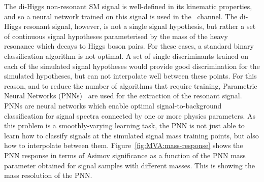 


The di-Higgs non-resonant SM signal is well-defined in its kinematic properties, and so a 
neural network trained on this signal is used in the \lephad\ channel.
The di-Higgs resonant signal, however, is not a single signal hypothesis, 
but rather a set of continuous signal hypotheses parameterised by 
the mass of the heavy resonance which decays to Higgs boson pairs.
For these cases, a standard binary classification algorithm is not optimal. 
A set of single discriminants trained on each of the simulated signal hypotheses 
would provide good discrimination for the simulated hypotheses, 
but can not interpolate well between these points. 
For this reason, and to reduce the number of algorithms that require training, 
Parametric Neural Networks (PNNs)~\cite{Baldi:2016fzo} are used 
for the extraction of the resonant signal. PNNs are neural networks 
which enable optimal signal-to-background classification
for signal spectra connected by one or more physics parameters. 
As this problem is a smoothly-varying learning task, 
the PNN is not just able to learn how to classify signals at the simulated signal mass training
points, but also how to interpolate between them. 
Figure~\ref{fig:MVA:mass-response} shows the PNN response 
in terms of Asimov significance as a function of the PNN mass
parameter obtained for signal samples with different masses. 
This is showing the mass resolution of the PNN.

